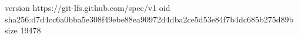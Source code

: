 version https://git-lfs.github.com/spec/v1
oid sha256:d7d4cc6a0bba5e308f49ebe88ea90972d4dba2ce5d53e84f7b4dc685b275d89b
size 19478
